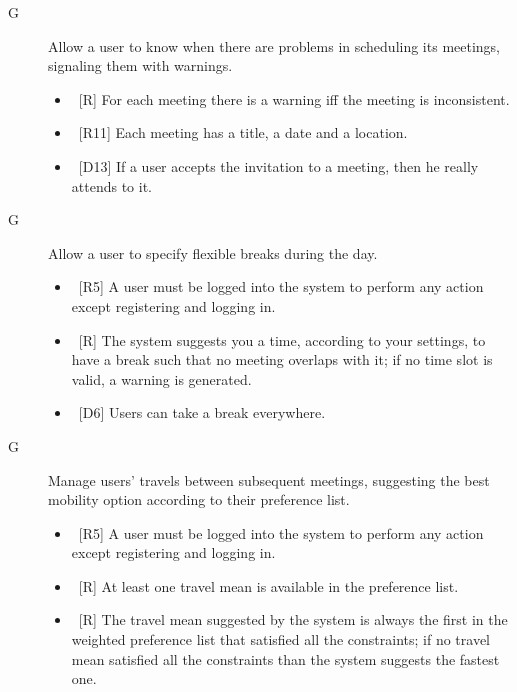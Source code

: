 \begin{description}
\item[G\thecountGoal] Allow a user to know when there are problems in scheduling its meetings, signaling them with warnings.

\begin{itemize}
\item~[R\reqNum] For each meeting there is a warning iff the meeting is inconsistent.
\item~[R11] Each meeting has a title, a date and a location.
\end{itemize}

\begin{itemize}
\item~[D13] If a user accepts the invitation to a meeting, then he really attends to it.
\end{itemize}

\item[G\thecountGoal] Allow a user to specify flexible breaks during the day.

\begin{itemize}
\item~[R5] A user must be logged into the system to perform any action except registering and logging in.
\item~[R\reqNum] The system suggests you a time, according to your settings, to have a break such that no meeting overlaps with it; if no time slot is valid, a warning is generated.
\end{itemize}

\begin{itemize}
\item~[D6] Users can take a break everywhere.
\end{itemize}

\item[G\thecountGoal] Manage users’ travels between subsequent meetings, suggesting the best mobility option according to their preference list.

\begin{itemize}
\item~[R5] A user must be logged into the system to perform any action except registering and logging in.
\item~[R\reqNum] At least one travel mean is available in the preference list.
\item~[R\reqNum] The travel mean suggested by the system is always the first in the weighted preference list that satisfied all the constraints; if no travel mean satisfied all the constraints than the system suggests the fastest one.
\end{itemize}


\end{description}
